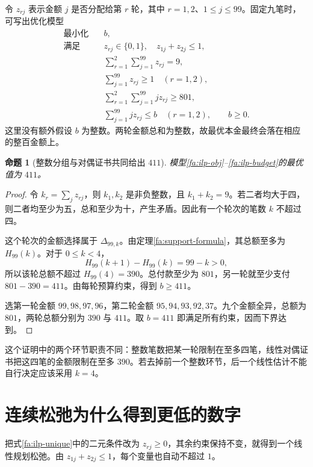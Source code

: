 \documentclass[UTF8,a4paper]{ctexbook}
\newtheorem{proposition}[theorem]{命题}
\theoremstyle{definition}
\numberwithin{equation}{chapter}
\newcommand{\1}{\mathbf{1}}
\begin{document}
令 $z_{rj}$ 表示金额 $j$ 是否分配给第 $r$ 轮，其中 $r=1,2$、$1\le j\le99$。固定九笔时，可写出优化模型
\begin{align}
\text{最小化}\quad &b,\label{fa:ilp-obj}\\
\text{满足}\quad
&z_{rj}\in\{0,1\},\quad z_{1j}+z_{2j}\le1,\label{fa:ilp-unique}\\
&\sum_{r=1}^2\sum_{j=1}^{99}z_{rj}=9,\label{fa:ilp-count}\\
&\sum_{j=1}^{99}z_{rj}\ge1\quad(r=1,2),\label{fa:ilp-nonempty}\\
&\sum_{r=1}^2\sum_{j=1}^{99}jz_{rj}\ge801,\label{fa:ilp-target}\\
&\sum_{j=1}^{99}jz_{rj}\le b\quad(r=1,2),\qquad b\ge0.\label{fa:ilp-budget}
\end{align}
这里没有额外假设 $b$ 为整数。两轮金额总和为整数，故最优本金最终会落在相应的整百金额上。

\begin{proposition}[整数分组与对偶证书共同给出 $411$]\label{fa:integer-cut}
模型\eqref{fa:ilp-obj}--\eqref{fa:ilp-budget}的最优值为 $411$。
\end{proposition}

\begin{proof}
令 $k_r=\sum_jz_{rj}$，则 $k_1,k_2$ 是非负整数，且 $k_1+k_2=9$。若二者均大于四，则二者均至少为五，总和至少为十，产生矛盾。因此有一个轮次的笔数 $k$ 不超过四。

这个轮次的金额选择属于 $\Delta_{99,k}$。由定理\ref{fa:support-formula}，其总额至多为 $H_{99}(k)$。对于 $0\le k<4$，
\[
H_{99}(k+1)-H_{99}(k)=99-k>0,
\]
所以该轮总额不超过 $H_{99}(4)=390$。总付款至少为 $801$，另一轮就至少支付 $801-390=411$。由每轮预算约束，得到 $b\ge411$。

选第一轮金额 $99,98,97,96$，第二轮金额 $95,94,93,92,37$。九个金额全异，总额为 $801$，两轮总额分别为 $390$ 与 $411$。取 $b=411$ 即满足所有约束，因而下界达到。
\end{proof}

这个证明中的两个环节职责不同：整数笔数把某一轮限制在至多四笔，线性对偶证书把这四笔的金额限制在至多 $390$。若去掉前一个整数环节，后一个线性估计不能自行决定应该采用 $k=4$。

\section{连续松弛为什么得到更低的数字}

把式\eqref{fa:ilp-unique}中的二元条件改为 $z_{rj}\ge0$，其余约束保持不变，就得到一个线性规划松弛。由 $z_{1j}+z_{2j}\le1$，每个变量也自动不超过 $1$。
\end{document}
